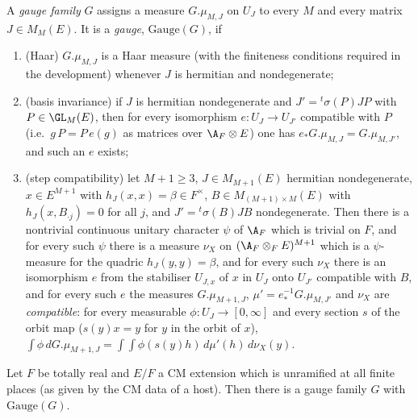 \begin{definition}\label{pf:baselat1:def:gauge}
A \emph{gauge family} $G$ assigns a measure $G.\mu_{M,J}$ on $U_J$ to every $M$ and
every matrix $J\in M_M(E)$. It is a \emph{gauge}, $\mathrm{Gauge}(G)$, if
\begin{enumerate}[label=(\alph*)]
\item (Haar) $G.\mu_{M,J}$ is a Haar measure (with the finiteness conditions required in the development)
  whenever $J$ is hermitian and nondegenerate;
\item (basis invariance) if $J$ is hermitian nondegenerate and $J'={}^t\!\sigma(P)JP$ with $P\in\GL_M(E)$,
  then for every isomorphism $e\colon U_J\to U_{J'}$ compatible with $P$ (i.e.\ $g\,P=P\,e(g)$ as
  matrices over $\A_F\otimes E$) one has $e_*G.\mu_{M,J}=G.\mu_{M,J'}$, and such an $e$ exists;
\item (step compatibility) let $M+1\ge3$, $J\in M_{M+1}(E)$ hermitian nondegenerate, $x\in E^{M+1}$ with
  $h_J(x,x)=\beta\in F^\times$, $B\in M_{(M+1)\times M}(E)$ with $h_J(x,B_{\cdot j})=0$ for all $j$, and
  $J'={}^t\!\sigma(B)JB$ nondegenerate. Then there is a nontrivial continuous unitary character $\psi$ of $\A_F$ which is
  trivial on $F$, and for every such $\psi$ there is a measure $\nu_X$ on $(\A_F\otimes_FE)^{M+1}$ which is a
  $\psi$-measure for the quadric $h_J(y,y)=\beta$, and for
  every such $\nu_X$ there is an isomorphism $e$ from the stabiliser $U_{J,x}$ of $x$ in $U_J$ onto $U_{J'}$
  compatible with $B$, and for every such $e$ the measures $G.\mu_{M+1,J}$, $\mu'=e^{-1}_*G.\mu_{M,J'}$ and
  $\nu_X$ are \emph{compatible}: for every measurable $\phi\colon U_J\to[0,\infty]$ and
  every section $s$ of the orbit map ($s(y)x=y$ for $y$ in the orbit of $x$),
  $\int\phi\,dG.\mu_{M+1,J}=\int\!\!\int\phi(s(y)h)\,d\mu'(h)\,d\nu_X(y)$.
\end{enumerate}
%
\end{definition}

\begin{theorem}\label{pf:baselat1:gauge}
Let $F$ be totally real and $E/F$ a CM extension which is unramified at all finite places (as given by the CM
data of a host). Then there is a gauge family $G$ with $\mathrm{Gauge}(G)$.
\end{theorem}

